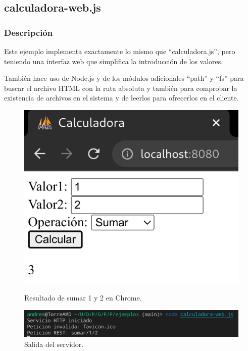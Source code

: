 \documentclass{article}
\begin{document}
\subsection{calculadora-web.js}
\subsubsection{Descripción}
Este ejemplo implementa exactamente lo mismo que ``calculadora.js'', pero teniendo una interfaz web que simplifica la introducción de los valores.

También hace uso de Node.js y de los módulos adicionales ``path'' y ``fs'' para buscar el archivo HTML con la ruta absoluta y también para comprobar la existencia de archivos en el sistema y de leerlos para ofrecerlos en el cliente.

\begin{figure}[H]
    \centering
    \begin{minipage}[H]{0.49\textwidth}
        \centering
        \includegraphics[width=\textwidth]{images/cwebsuma.png}
        \caption{Resultado de sumar 1 y 2 en Chrome.}
    \end{minipage}
    \hfill
    \begin{minipage}[H]{0.49\textwidth}
        \centering
        \includegraphics[width=\textwidth]{images/cwebsumaserver.png}
        \caption{Salida del servidor.}
    \end{minipage}
\end{figure}
\end{document}

